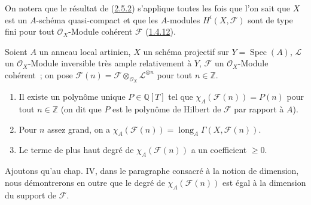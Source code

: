 On notera que le résultat de (\hyperref[III.2.5.2-fr]{2.5.2}) s'applique
toutes les fois que l'on sait que $X$ est un $A$-schéma quasi-compact et
que les $A$-modules $H^i(X,\mathcal F)$ sont de type fini pour tout
$\mathcal O_X$-Module cohérent $\mathcal F$
(\hyperref[III.1.4.12-fr]{1.4.12}).

\begin{theorem}[2.5.3]
\label{III.2.5.3-fr}
Soient $A$ un anneau local artinien, $X$ un schéma projectif sur
$Y=\operatorname{Spec}(A)$, $\mathcal L$ un $\mathcal O_X$-Module
inversible très ample relativement à $Y$, $\mathcal F$ un
$\mathcal O_X$-Module cohérent~; on pose
$\mathcal F(n)=\mathcal F\otimes_{\mathcal O_X}\mathcal L^{\otimes n}$
pour tout $n\in\mathbb Z$.
\begin{enumerate}
\item[(i)] Il existe un polynôme unique $P\in\mathbb Q[T]$ tel que
$\chi_A(\mathcal F(n))=P(n)$ pour tout $n\in\mathbb Z$ (on dit que $P$
est le polynôme de Hilbert de $\mathcal F$ par rapport à $A$).
\item[(ii)] Pour $n$ assez grand, on a
$\chi_A(\mathcal F(n))=\operatorname{long}_A
\Gamma(X,\mathcal F(n))$.
\item[(iii)] Le terme de plus haut degré de $\chi_A(\mathcal F(n))$ a un
coefficient $\geq0$.
\end{enumerate}
\end{theorem}

Ajoutons qu'au chap. IV, dans le paragraphe consacré à la notion de
dimension, nous démontrerons en outre que le degré de
$\chi_A(\mathcal F(n))$ est égal à la dimension du support de
$\mathcal F$.

